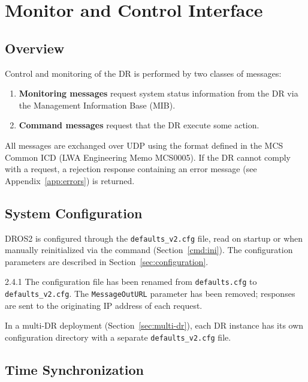 
\chapter{Monitor and Control Interface}
\label{sec:monitor-control}

\section{Overview}

Control and monitoring of the DR is performed by two classes of messages:

\begin{enumerate}
    \item \textbf{Monitoring messages} request system status information from the
          DR via the Management Information Base (MIB).
    \item \textbf{Command messages} request that the DR execute some action.
\end{enumerate}

All messages are exchanged over UDP using the format defined in the MCS Common
ICD (LWA Engineering Memo MCS0005).  If the DR cannot comply with a request, a rejection
response containing an error message (see Appendix~\ref{app:errors}) is
returned.

\section{System Configuration}
\label{sec:config}

DROS2 is configured through the \texttt{defaults\_v2.cfg} file, read on
startup or when manually reinitialized via the  command
(Section~\ref{cmd:ini}).  The configuration parameters are described in
Section~\ref{sec:configuration}.

\begin{newInVersion}{2.4.1}
The configuration file has been renamed from \texttt{defaults.cfg} to
\texttt{defaults\_v2.cfg}.  The \texttt{MessageOutURL} parameter has been
removed; responses are sent to the originating IP address of each request.
\end{newInVersion}

In a multi-DR deployment (Section~\ref{sec:multi-dr}), each DR instance has its
own configuration directory with a separate \texttt{defaults\_v2.cfg} file.

\section{Time Synchronization}

